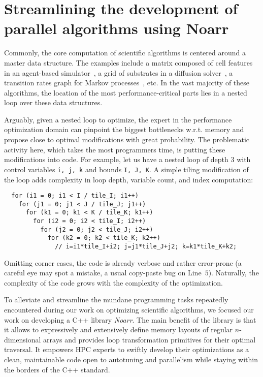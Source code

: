 \chapter{Streamlining the development of parallel algorithms using Noarr}
\label{chap:noarr}

Commonly, the core computation of scientific algorithms is centered around a master data structure. The examples include a matrix composed of cell features in an agent-based simulator~\cite{ghaffarizadeh2018physicell}, a grid of substrates in a diffusion solver~\cite{ghaffarizadeh2016biofvm}, a transition rates graph for Markov processes~\cite{koltai2020exact}, etc. In the vast majority of these algorithms, the location of the most performance-critical parts lies in a nested loop over these data structures.

Arguably, given a nested loop to optimize, the expert in the performance optimization domain can pinpoint the biggest bottlenecks w.r.t. memory and propose close to optimal modifications with great probability. The problematic activity here, which takes the most programmers time, is putting these modifications into code. For example, let us have a nested loop of depth 3 with control variables \texttt{i, j, k} and bounds \texttt{I, J, K}. A simple tiling modification of the loop adds complexity in loop depth, variable count, and index computation:
\begin{verbatim}
  for (i1 = 0; i1 < I / tile_I; i1++)
    for (j1 = 0; j1 < J / tile_J; j1++)
      for (k1 = 0; k1 < K / tile_K; k1++)
        for (i2 = 0; i2 < tile_I; i2++)
          for (j2 = 0; j2 < tile_J; i2++)
            for (k2 = 0; k2 < tile_K; k2++)
              // i=i1*tile_I+i2; j=j1*tile_J+j2; k=k1*tile_K+k2;
\end{verbatim}
Omitting corner cases, the code is already verbose and rather error-prone (a careful eye may spot a mistake, a usual copy-paste bug on Line~$5$).
Naturally, the complexity of the code grows with the complexity of the optimization.

To alleviate and streamline the mundane programming tasks repeatedly encountered during our work on optimizing scientific algorithms, we focused our work on developing a C++ library \emph{Noarr}. The main benefit of the library is that it allows to expressively and extensively define memory layouts of regular $n$-dimensional arrays and provides loop transformation primitives for their optimal traversal. It empowers HPC experts to swiftly develop their optimizations as a clean, maintainable code open to autotuning and parallelism while staying within the borders of the C++ standard.


